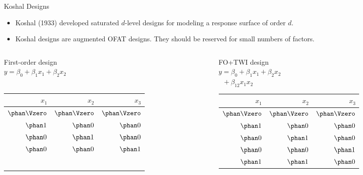 \documentclass[9pt]{beamer}
\newcommand\hi{$\phan1$}
\newcommand\ze{$\phan0$}
\newcommand\Ze{$\phan\Vzero$}
\begin{document}
\begin{frame}{Koshal Designs}
\begin{itemize}
	\item Koshal (1933) developed saturated $d$-level designs for modeling a response surface of order $d$.
	\item Koshal designs are augmented OFAT designs. They should be reserved for small numbers of factors.
\end{itemize}

{\small
\begin{columns}
\begin{column}{0.3\textwidth}
	\begin{center}
		First-order design\\
		$y = \beta_0 + \beta_1x_1 + \beta_2x_2$\\
				$\phantom{+}$ \\
		\smallskip
		\begin{tabular}{rrr}
			\toprule
			$x_1$ & $x_2$ & $x_3$ \\
			\midrule
			\Ze & \Ze & \Ze \\
			\hi & \ze & \ze \\
			\ze & \hi & \ze \\
			\ze & \ze & \hi \\
			\bottomrule
			\\
			\\
			\\
			\\
			\\
			\\
		\end{tabular}
	\end{center}
\end{column}
\begin{column}{0.3\textwidth}
	\begin{center}
		FO+TWI design\\
		$y = \beta_0 + \beta_1x_1 + \beta_2x_2$\\
				$\phantom{x} + \beta_{12}x_1x_2$ \\
		\smallskip
		\begin{tabular}{rrr}
			\toprule
			$x_1$ & $x_2$ & $x_3$ \\
			\midrule
			\Ze & \Ze & \Ze \\
			\hi & \ze & \ze \\
			\ze & \hi & \ze \\
			\ze & \ze & \hi \\
			\hi & \hi & \ze \\

\end{tabular}
\end{center}
\end{column}
\end{columns}}
\end{frame}
\end{document}
